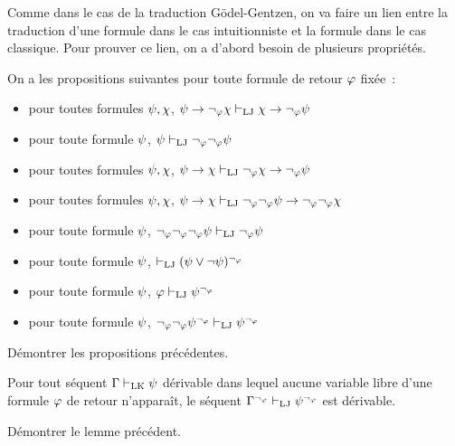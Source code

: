 Comme dans le cas de la traduction Gödel-Gentzen, on va faire un lien entre la
traduction d'une formule dans le cas intuitionniste et la formule dans le cas
classique. Pour prouver ce lien, on a d'abord besoin de plusieurs propriétés.

\begin{property}\label{prop.friedman}
  On a les propositions suivantes pour toute formule de retour $\varphi$
  fixée~:
  \begin{itemize}
  \item pour toutes formules $\psi,\chi$,
    $\psi \to \lnot_\varphi \chi \vdash_{\operatorname{LJ}} \chi \to \lnot_\varphi \psi$
  \item pour toute formule $\psi$,
    $\psi \vdash_{\operatorname{LJ}} \lnot_\varphi\lnot_\varphi \psi$
  \item pour toutes formules $\psi,\chi$,
    $\psi\to\chi \vdash_{\operatorname{LJ}} \lnot_\varphi \chi \to \lnot_\varphi \psi$
  \item pour toutes formules $\psi,\chi$,
    $\psi\to\chi\vdash_{\operatorname{LJ}}
    \lnot_\varphi\lnot_\varphi \psi \to \lnot_\varphi\lnot_\varphi\chi$
  \item pour toute formule $\psi$,
    $\lnot_\varphi\lnot_\varphi\lnot_\varphi \psi \vdash_{\operatorname{LJ}} \lnot_\varphi \psi$
  \item pour toute formule $\psi$,
    $\vdash_{\operatorname{LJ}} (\psi \lor \lnot\psi)^{\lnot_\varphi}$
  \item pour toute formule $\psi$,
    $\varphi\vdash_{\operatorname{LJ}}\psi^{\lnot_\varphi}$
  \item pour toute formule $\psi$,
    $\lnot_\varphi\lnot_\varphi\psi^{\lnot_\varphi}\vdash_{\operatorname{LJ}} \psi^{\lnot_\varphi}$
  \end{itemize}
\end{property}

\begin{exercise}
  Démontrer les propositions précédentes.
\end{exercise}

\begin{lemma}
  Pour tout séquent $\Gamma\vdash_{\operatorname{LK}} \psi$ dérivable dans lequel aucune variable
  libre d'une formule $\varphi$ de retour n'apparaît, le séquent
  $\Gamma^{\lnot_\varphi}\vdash_{\operatorname{LJ}}\psi^{\lnot_\varphi}$ est dérivable.
\end{lemma}

\begin{exercise}
  Démontrer le lemme précédent.
\end{exercise}

